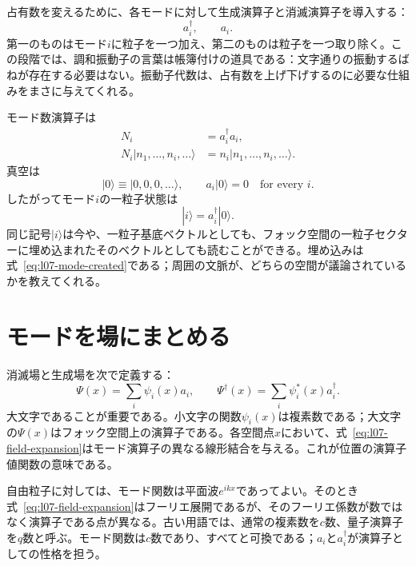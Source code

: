 占有数を変えるために、各モードに対して生成演算子と消滅演算子を導入する：
\begin{equation}
a_i^\dagger,\qquad a_i.
\end{equation}
第一のものはモード\(i\)に粒子を一つ加え、第二のものは粒子を一つ取り除く。この段階では、調和振動子の言葉は帳簿付けの道具である：文字通りの振動するばねが存在する必要はない。振動子代数は、占有数を上げ下げするのに必要な仕組みをまさに与えてくれる。

モード数演算子は
\begin{equation}
\begin{aligned}
N_i&=a_i^\dagger a_i,\\
N_i|n_1,\ldots,n_i,\ldots\rangle
&=n_i|n_1,\ldots,n_i,\ldots\rangle.
\end{aligned}
\end{equation}
真空は
\begin{equation}
|0\rangle\equiv|0,0,0,\ldots\rangle,
\qquad
a_i|0\rangle=0
\quad\text{for every }i.
\label{eq:l07-vacuum}
\end{equation}
したがってモード\(i\)の一粒子状態は
\begin{equation}
|i\rangle=a_i^\dagger|0\rangle.
\label{eq:l07-mode-created}
\end{equation}
同じ記号\(|i\rangle\)は今や、一粒子基底ベクトルとしても、フォック空間の一粒子セクターに埋め込まれたそのベクトルとしても読むことができる。埋め込みは式~\eqref{eq:l07-mode-created}である；周囲の文脈が、どちらの空間が議論されているかを教えてくれる。

\section{モードを場にまとめる}

消滅場と生成場を次で定義する：
\begin{equation}
\Psi(x)=\sum_i \psi_i(x)a_i,
\qquad
\Psi^\dagger(x)=\sum_i \psi_i^*(x)a_i^\dagger.
\label{eq:l07-field-expansion}
\end{equation}
大文字であることが重要である。小文字の関数\(\psi_i(x)\)は複素数である；大文字の\(\Psi(x)\)はフォック空間上の演算子である。各空間点\(x\)において、式~\eqref{eq:l07-field-expansion}はモード演算子の異なる線形結合を与える。これが位置の演算子値関数の意味である。

自由粒子に対しては、モード関数は平面波\(e^{ikx}\)であってよい。そのとき式~\eqref{eq:l07-field-expansion}はフーリエ展開であるが、そのフーリエ係数が数ではなく演算子である点が異なる。古い用語では、通常の複素数を\(c\)数、量子演算子を\(q\)数と呼ぶ。モード関数は\(c\)数であり、すべてと可換である；\(a_i\)と\(a_i^\dagger\)が演算子としての性格を担う。


